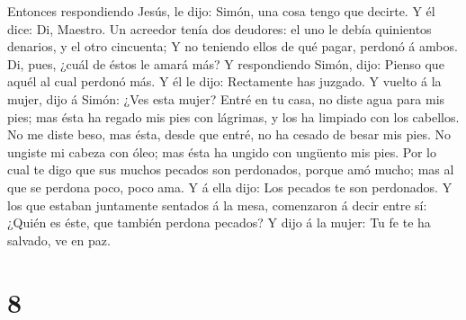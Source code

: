 Entonces respondiendo Jesús, le dijo: Simón, una cosa tengo que decirte.
Y él dice: Di, Maestro.  Un acreedor tenía dos deudores:
el uno le debía quinientos denarios, y el otro cincuenta;
 Y no teniendo ellos de qué pagar, perdonó á ambos. Di,
pues, ¿cuál de éstos le amará más?  Y respondiendo Simón,
dijo: Pienso que aquél al cual perdonó más. Y él le dijo: Rectamente has
juzgado.  Y vuelto á la mujer, dijo á Simón: ¿Ves esta
mujer? Entré en tu casa, no diste agua para mis pies; mas ésta ha regado
mis pies con lágrimas, y los ha limpiado con los cabellos.
 No me diste beso, mas ésta, desde que entré, no ha
cesado de besar mis pies.  No ungiste mi cabeza con óleo;
mas ésta ha ungido con ungüento mis pies.  Por lo cual te
digo que sus muchos pecados son perdonados, porque amó mucho; mas al que
se perdona poco, poco ama.  Y á ella dijo: Los pecados te
son perdonados.  Y los que estaban juntamente sentados á
la mesa, comenzaron á decir entre sí: ¿Quién es éste, que también
perdona pecados?  Y dijo á la mujer: Tu fe te ha salvado,
ve en paz.

\hypertarget{section-7}{%
\section{8}\label{section-7}}

